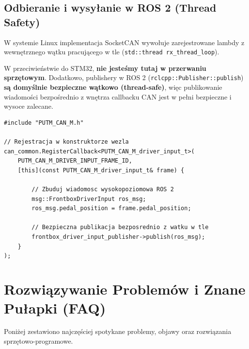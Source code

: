 \documentclass[a4paper,11pt]{article}
\begin{document}
\vspace{1em}

\begin{ros2box}
\subsection*{Odbieranie i wysyłanie w ROS 2 (Thread Safety)}

W systemie Linux implementacja SocketCAN wywołuje zarejestrowane lambdy z wewnętrznego wątku pracującego w tle (\texttt{std::thread rx\_thread\_loop}). 

W przeciwieństwie do STM32, \textbf{nie jesteśmy tutaj w przerwaniu sprzętowym}. Dodatkowo, publishery w ROS 2 (\texttt{rclcpp::Publisher::publish}) \textbf{są domyślnie bezpieczne wątkowo (thread-safe)}, więc publikowanie wiadomości bezpośrednio z wnętrza callbacku CAN jest w pełni bezpieczne i wysoce zalecane.

\begin{lstlisting}[caption=Przykład asynchronicznego odbioru w ROS 2]
#include "PUTM_CAN_M.h"

// Rejestracja w konstruktorze wezla
can_common.RegisterCallback<PUTM_CAN_M_driver_input_t>(
    PUTM_CAN_M_DRIVER_INPUT_FRAME_ID,
    [this](const PUTM_CAN_M_driver_input_t& frame) {
        
        // Zbuduj wiadomosc wysokopoziomowa ROS 2
        msg::FrontboxDriverInput ros_msg;
        ros_msg.pedal_position = frame.pedal_position;
        
        // Bezpieczna publikacja bezposrednio z watku w tle
        frontbox_driver_input_publisher->publish(ros_msg);
    }
);
\end{lstlisting}
\end{ros2box}

\newpage

\section{Rozwiązywanie Problemów i Znane Pułapki (FAQ)}

Poniżej zestawiono najczęściej spotykane problemy, objawy oraz rozwiązania sprzętowo-programowe.
\end{document}
